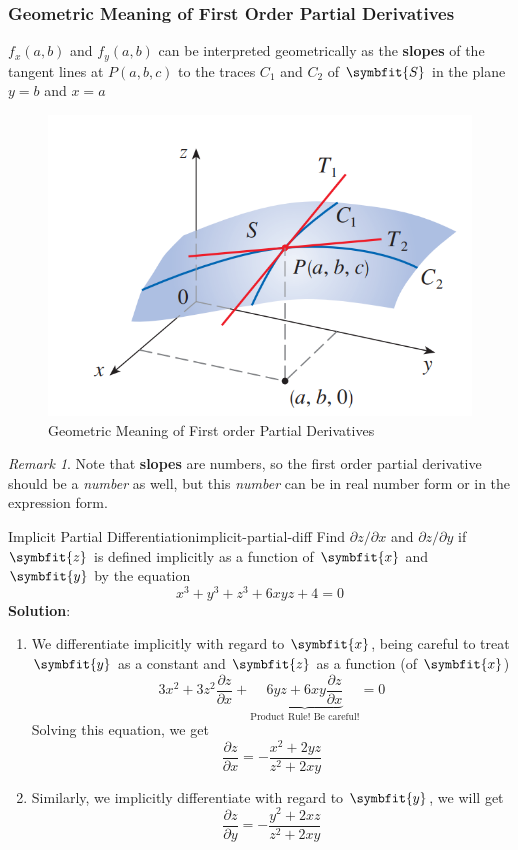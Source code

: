 \documentclass[math,code]{amznotes}
\theoremstyle{remark}
\newtheorem*{remark}{Remark}
\begin{document}
\subsubsection{Geometric Meaning of First Order Partial Derivatives} \label{sec:geometric-meaing-of-first-order-partial-deri}
$f_x(a,b)$ and $f_y(a,b)$ can be interpreted geometrically as the {\color{red} \textbf{slopes}} of the tangent lines at $P(a,b,c)$ to the traces $C_1$ and $C_2$ of $\symbfit{S}$ in the plane $y=b$ and $x=a$
\begin{figure}[H]
    \centering
    \includegraphics[width=0.3\linewidth]{images/partial-derivative-geometric-meaning.png}
    \caption{Geometric Meaning of First order Partial Derivatives}
    \label{fig:geo-meaning-first-order-partial-derivative}
\end{figure}
\begin{notebox}
    \begin{remark}
        Note that \textbf{slopes} are numbers, so the first order partial derivative should be a \textit{number} as well, but this \textit{number} can be in real number form or in the expression form.
    \end{remark}
\end{notebox}
\begin{exbox}{Implicit Partial Differentiation}{implicit-partial-diff}
    Find $\partial z / \partial x$ and $\partial z / \partial y$ if $\symbfit{z}$ is defined implicitly as a function of $\symbfit{x}$ and $\symbfit{y}$ by the equation
    \begin{displaymath}
        x^3+y^3+z^3+6xyz+4=0
    \end{displaymath}
    {\color{blue} \textbf{Solution}}:
    \begin{enumerate}
        \item We differentiate implicitly with regard to $\symbfit{x}$, being careful to treat $\symbfit{y}$ as a constant and $\symbfit{z}$ as a function (of $\symbfit{x}$)
        \begin{displaymath}
            3x^2+3z^2\frac{\partial z}{\partial x}+\underbrace{6yz+6xy\frac{\partial z}{\partial x}}_\text{Product Rule! Be careful!}=0
        \end{displaymath}
        Solving this equation, we get
        \begin{displaymath}
            \frac{\partial z}{\partial x}=-\frac{x^2+2yz}{z^2+2xy}
        \end{displaymath}
        \item Similarly, we implicitly differentiate with regard to $\symbfit{y}$, we will get
        \begin{displaymath}
            \frac{\partial z}{\partial y}=-\frac{y^2+2xz}{z^2+2xy}
        \end{displaymath}
    \end{enumerate}
\end{exbox}
\end{document}
